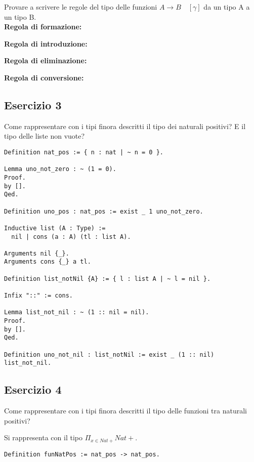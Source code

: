 Provare a scrivere le regole del tipo delle funzioni $A \rightarrow B \quad [\gamma]$ da un
tipo A a un tipo B. \\

\textbf{Regola di formazione:}

\begin{prooftree}
\end{prooftree}

\textbf{Regola di introduzione:}

\begin{prooftree}
\end{prooftree}

\textbf{Regola di eliminazione:}

\begin{prooftree}
\end{prooftree}

\textbf{Regola di conversione:}

\begin{prooftree}
\end{prooftree}

\subsection{Esercizio 3}

Come rappresentare con i tipi finora descritti il tipo dei naturali positivi?
E il tipo delle liste non vuote?

\begin{lstlisting}[language=Coq]
Definition nat_pos := { n : nat | ~ n = 0 }.

Lemma uno_not_zero : ~ (1 = 0).
Proof.
by [].
Qed.

Definition uno_pos : nat_pos := exist _ 1 uno_not_zero.

Inductive list (A : Type) :=
  nil | cons (a : A) (tl : list A).

Arguments nil {_}.
Arguments cons {_} a tl.

Definition list_notNil {A} := { l : list A | ~ l = nil }.

Infix "::" := cons.

Lemma list_not_nil : ~ (1 :: nil = nil).
Proof.
by [].
Qed.

Definition uno_not_nil : list_notNil := exist _ (1 :: nil) list_not_nil.

\end{lstlisting}

\subsection{Esercizio 4}

Come rappresentare con i tipi finora descritti il tipo delle funzioni tra
naturali positivi?

Si rappresenta con il tipo $\Pi_{x \in Nat+} Nat+$.

\begin{lstlisting}[language=Coq]
Definition funNatPos := nat_pos -> nat_pos.
\end{lstlisting}
